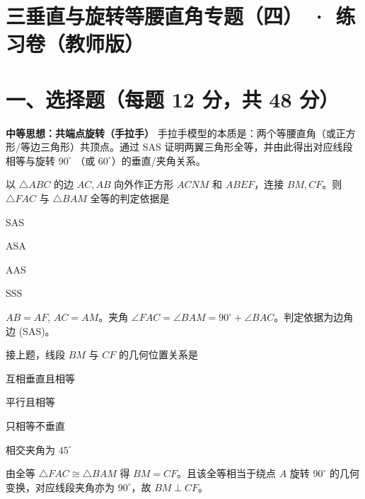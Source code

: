 \documentclass{exam-zh}
\begin{document}
\section*{三垂直与旋转等腰直角专题（四） · 练习卷（教师版）}

\section*{一、选择题（每题 12 分，共 48 分）}


\begin{keyideabox}
  \textbf{中等思想：共端点旋转（手拉手）}
  手拉手模型的本质是：两个等腰直角（或正方形/等边三角形）共顶点。通过 SAS 证明两翼三角形全等，并由此得出对应线段相等与旋转 $90^\circ$ （或 $60^\circ$）的垂直/夹角关系。
\end{keyideabox}



\begin{question}[points=12]
  以 $\triangle ABC$ 的边 $AC, AB$ 向外作正方形 $ACNM$ 和 $ABEF$，连接 $BM, CF$。则 $\triangle FAC$ 与 $\triangle BAM$ 全等的判定依据是
  \begin{choices}
    \item SAS
    \item ASA
    \item AAS
    \item SSS
  \end{choices}
  \paren[A]
  \begin{solutionblock}
    $AB = AF$, $AC = AM$。夹角 $\angle FAC = \angle BAM = 90^\circ + \angle BAC$。判定依据为边角边 (SAS)。
  \end{solutionblock}
\end{question}



\begin{question}[points=12]
  接上题，线段 $BM$ 与 $CF$ 的几何位置关系是
  \begin{choices}
    \item 互相垂直且相等
    \item 平行且相等
    \item 只相等不垂直
    \item 相交夹角为 $45^\circ$
  \end{choices}
  \paren[A]
  \begin{solutionblock}
    由全等 $\triangle FAC \cong \triangle BAM$ 得 $BM = CF$。且该全等相当于绕点 $A$ 旋转 $90^\circ$ 的几何变换，对应线段夹角亦为 $90^\circ$，故 $BM \perp CF$。
  \end{solutionblock}
\end{question}
\end{document}

